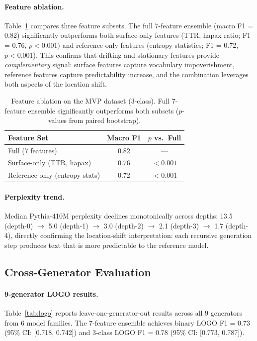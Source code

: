 \documentclass[11pt,a4paper]{article}
\begin{document}
\paragraph{Feature ablation.}
Table~\ref{tab:ablation} compares three feature subsets. The full 7-feature ensemble (macro F1 = 0.82) significantly outperforms both surface-only features (TTR, hapax ratio; F1 = 0.76, $p < 0.001$) and reference-only features (entropy statistics; F1 = 0.72, $p < 0.001$). This confirms that drifting and stationary features provide \emph{complementary} signal: surface features capture vocabulary impoverishment, reference features capture predictability increase, and the combination leverages both aspects of the location shift.

\begin{table}[t]
\centering
\small
\begin{tabular}{lcc}
\toprule
\textbf{Feature Set} & \textbf{Macro F1} & \textbf{$p$ vs.\ Full} \\
\midrule
Full (7 features)    & 0.82 & --- \\
Surface-only (TTR, hapax) & 0.76 & $< 0.001$ \\
Reference-only (entropy stats) & 0.72 & $< 0.001$ \\
\bottomrule
\end{tabular}
\caption{Feature ablation on the MVP dataset (3-class). Full 7-feature ensemble significantly outperforms both subsets ($p$-values from paired bootstrap).}
\label{tab:ablation}
\end{table}

\paragraph{Perplexity trend.}
Median Pythia-410M perplexity declines monotonically across depths: 13.5 (depth-0) $\to$ 5.0 (depth-1) $\to$ 3.0 (depth-2) $\to$ 2.1 (depth-3) $\to$ 1.7 (depth-4), directly confirming the location-shift interpretation: each recursive generation step produces text that is more predictable to the reference model.

\subsection{Cross-Generator Evaluation}
\label{sec:cross_gen}

\paragraph{9-generator LOGO results.}
Table~\ref{tab:logo} reports leave-one-generator-out results across all 9 generators from 6 model families. The 7-feature ensemble achieves binary LOGO F1 = 0.73 (95\% CI: [0.718, 0.742]) and 3-class LOGO F1 = 0.78 (95\% CI: [0.773, 0.787]).
\end{document}
